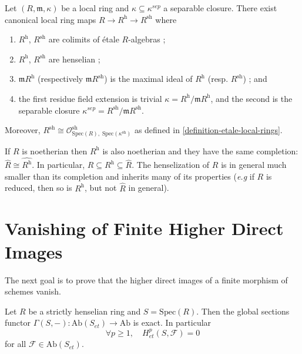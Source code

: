 \begin{theorem}
\label{theorem-henselization}
Let $(R, \mathfrak m, \kappa)$ be a local ring and
$\kappa\subseteq\kappa^{sep}$ a separable closure. There exist canonical local
ring maps $ R\to R^\text{h} \to R^\text{sh}$ where
\begin{enumerate}
\item $R^\text{h}$, $R^\text{sh}$ are colimits of \'etale $R$-algebras ;
\item $R^\text{h}$, $R^\text{sh}$ are henselian ;
\item $\mathfrak m R^\text{h}$ (respectively $\mathfrak m R^\text{sh}$) is the
maximal ideal of $R^\text{h}$ (resp. $R^\text{sh}$) ; and
\item the first residue field extension is trivial $\kappa=R^\text{h}/\mathfrak
m R^\text{h}$, and the second is the separable closure $\kappa^{sep} =
R^\text{sh}/\mathfrak m R^\text{sh}$.
\end{enumerate}
Moreover,
$R^\text{sh} \cong \mathcal{O}^\text{sh}_{\text{Spec}(R), \;
\text{Spec}(\kappa^\text{sh})}$
as defined in \ref{definition-etale-local-rings}.
\end{theorem}

\begin{remark}
\label{remark-henselization-Noetherian}
If $R$ is noetherian then $R^\text{h}$ is also noetherian and they have the
same completion: $\hat R\cong \widehat{R^\text{h}}$. In particular, $R\subseteq
R^\text{h} \subseteq \hat R$. The henselization of $R$ is in general much
smaller than its completion and inherits many of its properties ({\it e.g} if
$R$ is reduced, then so is $R^\text{h}$, but not $\hat R$ in general).
\end{remark}




\section{Vanishing of Finite Higher Direct Images}
\label{section-vanishing-finite-morphism}

\noindent
The next goal is to prove that the higher direct images of a finite morphism of
schemes vanish.

\begin{lemma}
\label{lemma-vanishing-etale-cohomology-strictly-henselian}
Let $R$ be a strictly henselian ring and $S=\text{Spec}(R)$. Then the global
sections functor $\Gamma(S, -): \text{Ab}(S_{et})\to \text{Ab}$ is exact. In
particular
$$
\forall p\geq 1, \quad H_{et}^p(S, \mathcal{F})=0
$$
for all $\mathcal{F}\in \text{Ab}(S_{et})$.
\end{lemma}

